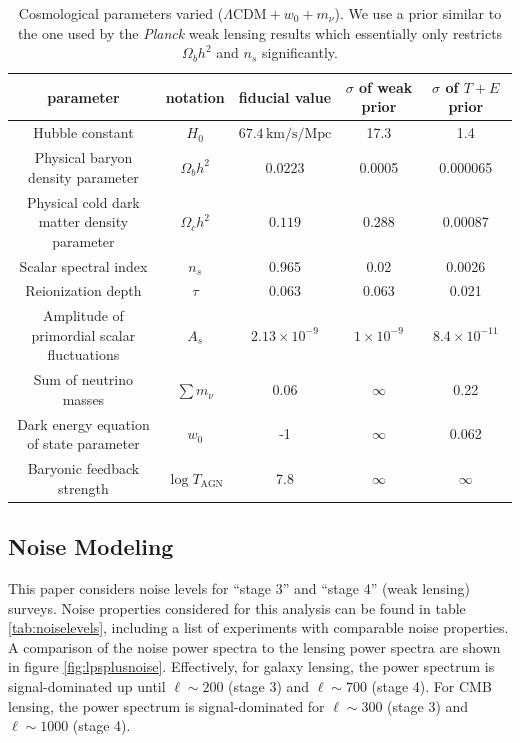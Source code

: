 \documentclass[11pt]{article} %
\begin{document}

\begin{table}[!]
    \centering
    \scriptsize
    \begin{tabular}{|c|c|c|c|c|}
        \hline
        \textbf{parameter} & \textbf{notation} & \textbf{fiducial value} & \textbf{$\sigma$ of weak prior} & \textbf{$\sigma$ of $T + E$ prior}\\
        \hline
        Hubble constant & $H_0$ & $67.4 \, \text{km/s/Mpc}$ & 17.3 & 1.4\\
        \hline
        Physical baryon density parameter & $\Omega_b h^2$ & $0.0223$ & 0.0005 & 0.000065\\
        \hline
        Physical cold dark matter density parameter & $\Omega_c h^2$ & $0.119$ & $0.288$ & 0.00087\\
        \hline
        Scalar spectral index & $n_s$ & 0.965 & 0.02 & 0.0026 \\
        \hline
        Reionization depth & $\tau$ & 0.063 & 0.063 & 0.021 \\
        \hline
        Amplitude of primordial scalar fluctuations & $A_s$ & $2.13 \times 10^{-9}$ & $1\times 10^{-9}$ & $8.4\times 10^{-11}$\\
        \hline
        Sum of neutrino masses & $\sum m_\nu$ & $0.06$ & $\infty$ & 0.22\\
        \hline
        Dark energy equation of state parameter & $w_0$ & -1 & $\infty$ & 0.062 \\ 
        \hline
        Baryonic feedback strength & $\log T_{\text{AGN}}$ & 7.8 & $\infty$ & $\infty$ \\
        \hline
    \end{tabular}
    \caption{Cosmological parameters varied ($\Lambda \text{CDM} + w_0 + m_\nu$). We use a prior similar to the one used by the \textit{Planck} weak lensing results \cite{Planck2018Lensing} which essentially only restricts $\Omega_bh^2$ and $n_s$ significantly.}
    \label{tab:fiducialpars}
\end{table}

\subsection{Noise Modeling}
This paper considers noise levels for ``stage 3'' and ``stage 4'' (weak lensing) surveys. Noise properties considered for this analysis can be found in table \ref{tab:noiselevels}, including a list of experiments with comparable noise properties. A comparison of the noise power spectra to the lensing power spectra are shown     in figure \ref{fig:lpsplusnoise}. Effectively, for galaxy lensing, the power spectrum is signal-dominated up until $\ell \sim 200$ (stage 3) and $\ell \sim 700$ (stage 4). For CMB lensing, the power spectrum is signal-dominated for $\ell \sim 300$ (stage 3) and $\ell \sim 1000$ (stage 4). 
\end{document}
